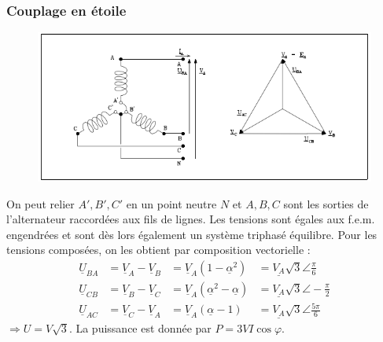\subsubsection{Couplage en étoile}
\begin{figure}
	\vspace{-5mm}
	\includegraphics[scale=0.4]{ch1/image9.png}
\end{figure}
On peut relier $A',B',C'$ en un point neutre $N$ et $A,B,C$ sont les 
sorties de l'alternateur raccordées aux fils de lignes. Les tensions 
sont égales aux f.e.m. engendrées et sont dès lors également un 
système triphasé équilibre. Pour les tensions composées, on les 
obtient par composition vectorielle :
\vspace{1cm}
\begin{equation}
	\begin{array}{llll}
		\underline{U}_{BA} & = \underline{V}_A-\underline{V}_B & = \underline{V}_A 
		(1-\underline{\alpha}^2) &= \underline{V_A}\sqrt{3}\angle\frac{\pi}{6}\\
		\underline{U}_{CB} & = \underline{V}_B-\underline{V}_C & = \underline{V}_A 
		(\underline{\alpha}^2-\underline{\alpha}) &= \underline{V_A}\sqrt{3}\angle
		-\frac{\pi}{2}		\\
		\underline{U}_{AC} & = \underline{V}_C-\underline{V}_A & = \underline{V}_A 
		(\underline{\alpha}-1) &= \underline{V_A}\sqrt{3}\angle\frac{5\pi}{6}
	\end{array}
\end{equation}
$\Longrightarrow U = V\sqrt{3}$. La puissance est donnée par $P = 3VI
\cos\varphi$.
		
